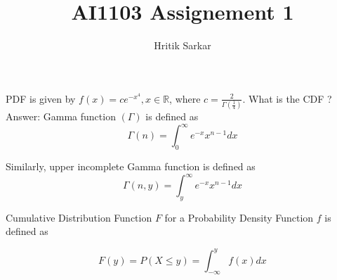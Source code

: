 \documentclass{article}
\title{AI1103 Assignement 1}
\author{Hritik Sarkar}
\theoremstyle{remark}
\begin{document}
\maketitle

PDF is given by  $f(x) = c e^{-x^{4}}, x\in \mathbb{R}$, where $ c = \frac{2}{\Gamma (\frac{1}{4})} $. What is the CDF ? \\
Answer: Gamma function $(\Gamma)$ is defined as 
\[
\Gamma (n) = \int_{0}^{\infty} e^{-x} x^{n-1} dx
\]

Similarly, upper incomplete Gamma function is defined as
\[
\Gamma (n,y) = \int_{y}^{\infty} e^{-x} x^{n-1} dx
\]

Cumulative Distribution Function $F$ for a Probability Density Function $f$ is defined as

\[
    F(y) = P(X\leq y) = \int_{-\infty}^{y} f(x) dx    
\]
\end{document}
